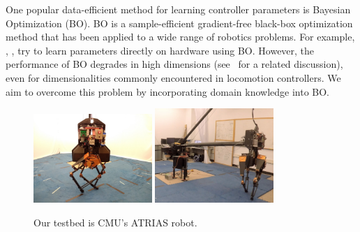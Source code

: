 One popular data-efficient method for learning controller parameters is Bayesian Optimization (BO). BO is a sample-efficient gradient-free black-box optimization method that has been applied to a wide range of robotics problems. For example, \cite{Calandra2016}, \cite{marco2017virtual}, \cite{cully2015robots} try to learn parameters directly on hardware using BO. However, the performance of BO degrades in high dimensions (see~\cite{localBO17} for a related discussion), even for dimensionalities commonly encountered in locomotion controllers. We aim to overcome this problem by incorporating domain knowledge into BO.
\begin{figure}
    \centering
    \includegraphics[width = 0.4\textwidth]{img/atrias1.jpg}
    \includegraphics[width = 0.4\textwidth]{img/atrias_dog5d_walking_around_boom.jpg}
    \caption{\small{Our testbed is CMU's ATRIAS robot. 
    }}
        \vspace{-5mm}
    \label{fig:atrias}
\end{figure}

